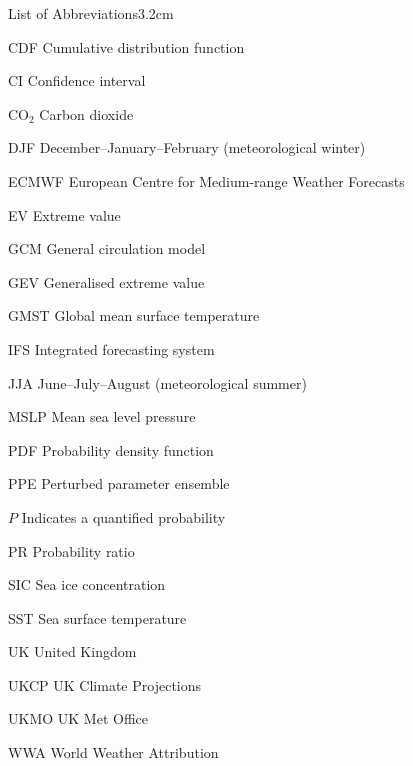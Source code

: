 \begin{mclistof}{List of Abbreviations}{3.2cm}

    \item[CDF] Cumulative distribution function
    \item[CI] Confidence interval 
    \item[CO$_2$] Carbon dioxide
    \item[DJF] December--January--February (meteorological winter)
    \item[ECMWF] European Centre for Medium-range Weather Forecasts
    \item[EV] Extreme value
    \item[GCM] General circulation model
    \item[GEV] Generalised extreme value
    \item[GMST] Global mean surface temperature
    \item[IFS] Integrated forecasting system
    \item[JJA] June--July--August (meteorological summer)
    \item[MSLP] Mean sea level pressure
    \item[PDF] Probability density function
    \item[PPE] Perturbed parameter ensemble
    \item[$P$] Indicates a quantified probability
    \item[PR] Probability ratio
    \item[SIC] Sea ice concentration
    \item[SST] Sea surface temperature
    \item[UK] United Kingdom
    \item[UKCP] UK Climate Projections
    \item[UKMO] UK Met Office
    \item[WWA] World Weather Attribution

\end{mclistof}